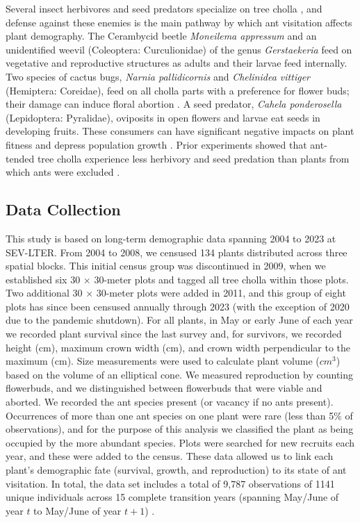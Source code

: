 \documentclass[11pt]{article}
\begin{document}
Several insect herbivores and seed predators specialize on tree cholla \citep{Mann1969}, and defense against these enemies is the main pathway by which ant visitation affects plant demography. 
The Cerambycid beetle \textit{Moneilema appressum} and an unidentified weevil (Coleoptera: Curculionidae) of the genus \textit{Gerstaekeria} feed on vegetative and reproductive structures as adults and their larvae feed internally. 
Two species of cactus bugs, \textit{Narnia pallidicornis} and \textit{Chelinidea vittiger} (Hemiptera: Coreidae), feed on all cholla parts with a preference for flower buds; their damage can induce floral abortion \citep{Miller2006}. 
A seed predator, \textit{Cahela ponderosella} (Lepidoptera: Pyralidae), oviposits in open flowers and larvae eat seeds in developing fruits. 
These consumers can have significant negative impacts on plant fitness and depress population growth \citep{Miller2009}.
Prior experiments showed that ant-tended tree cholla experience less herbivory and seed predation than plants from which ants were excluded \citep{Miller2007,Ohm2014}. 

\subsection*{Data Collection}
This study is based on long-term demographic data spanning 2004 to 2023 at SEV-LTER. 
From 2004 to 2008, we censused 134 plants distributed across three spatial blocks. 
This initial census group was discontinued in 2009, when we established six 30 $\times$ 30-meter plots and tagged all tree cholla within those plots. 
Two additional 30 $\times$ 30-meter plots were added in 2011, and this group of eight plots has since been censused annually through 2023 (with the exception of 2020 due to the pandemic shutdown). 
For all plants, in May or early June of each year we recorded plant survival since the last survey and, for survivors, we recorded height (cm), maximum crown width (cm), and crown width perpendicular to the maximum (cm).
Size measurements were used to calculate plant volume ($cm^3$) based on the volume of an elliptical cone. 
We measured reproduction by counting flowerbuds, and we distinguished between flowerbuds that were viable and aborted. 
We recorded the ant species present (or vacancy if no ants present).
Occurrences of more than one ant species on one plant were rare (less than 5\% of observations), and for the purpose of this analysis we classified the plant as being occupied by the more abundant species. 
Plots were searched for new recruits each year, and these were added to the census.
These data allowed us to link each plant's demographic fate (survival, growth, and reproduction) to its state of ant visitation. 
In total, the data set includes a total of 9,787 observations of 1141 unique individuals across 15 complete transition years (spanning May/June of year $t$ to May/June of year $t+1$) \citep{DataCholla}. 
\end{document}
